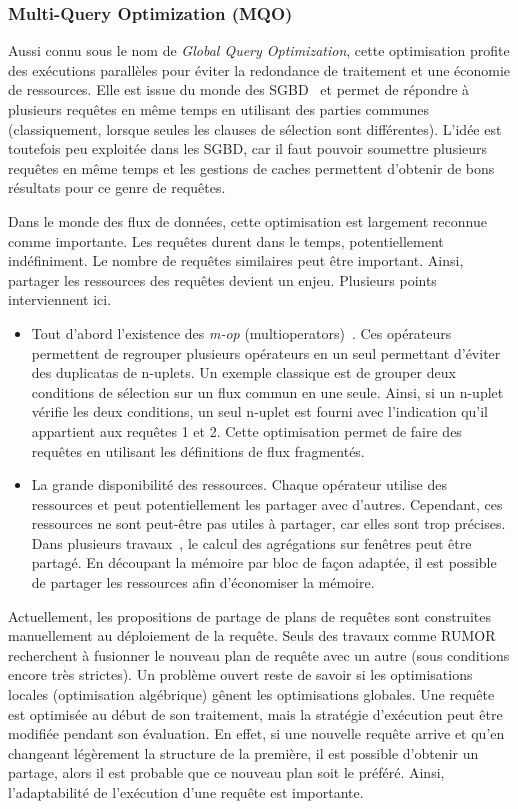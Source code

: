 \subsubsection{Multi-Query Optimization (MQO)}
Aussi connu sous le nom de \textit{Global Query Optimization}, cette optimisation profite des exécutions parallèles pour éviter la redondance de traitement et une économie de ressources. Elle est issue du monde des SGBD~\cite{Sellis:mqo} et permet de répondre à plusieurs requêtes en même temps en utilisant des parties communes (classiquement, lorsque seules les clauses de sélection sont différentes). L'idée est toutefois peu exploitée dans les SGBD, car il faut pouvoir soumettre plusieurs requêtes en même temps et les gestions de caches permettent d'obtenir de bons résultats pour ce genre de requêtes.

Dans le monde des flux de données, cette optimisation est largement reconnue comme importante. Les requêtes durent dans le temps, potentiellement indéfiniment. Le nombre de requêtes similaires peut être important. Ainsi, partager les ressources des requêtes devient un enjeu. Plusieurs points interviennent ici.
\begin{itemize}
 \item Tout d'abord l'existence des \textit{m-op} (multioperators)~\cite{Hong:mqo}. Ces opérateurs permettent de regrouper plusieurs opérateurs en un seul permettant d'éviter des duplicatas de n-uplets. Un exemple classique est de grouper deux conditions de sélection sur un flux commun en une seule. Ainsi, si un n-uplet vérifie les deux conditions, un seul n-uplet est fourni avec l'indication qu'il appartient aux requêtes 1 et 2. Cette optimisation permet de faire des requêtes en utilisant les définitions de flux fragmentés.
 \item La grande disponibilité des ressources. Chaque opérateur utilise des ressources et peut potentiellement les partager avec d'autres. Cependant, ces ressources ne sont peut-être pas utiles à partager, car elles sont trop précises. Dans plusieurs travaux~\cite{Arasu:resource}, le calcul des agrégations sur fenêtres peut être partagé. En découpant la mémoire par bloc de façon adaptée, il est possible de partager les ressources afin d'économiser la mémoire.
\end{itemize}

Actuellement, les propositions de partage de plans de requêtes sont construites manuellement au déploiement de la requête. Seuls des travaux comme RUMOR~\cite{Hong:mqo} recherchent à fusionner le nouveau plan de requête avec un autre (sous conditions encore très strictes). Un problème ouvert reste de savoir si les optimisations locales (optimisation algébrique) gênent les optimisations globales. Une requête est optimisée au début de son traitement, mais la stratégie d'exécution peut être modifiée pendant son évaluation. En effet, si une nouvelle requête arrive et qu'en changeant légèrement la structure de la première, il est possible d'obtenir un partage, alors il est probable que ce nouveau plan soit le préféré. Ainsi, l'adaptabilité de l'exécution d'une requête est importante.

